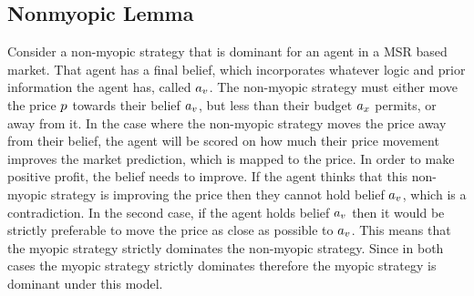 \subsection{Nonmyopic Lemma}
Consider a non-myopic strategy that is dominant for an agent in a MSR based market. That agent has a final belief, which incorporates whatever logic and prior information the agent has, called $a_v$. The non-myopic strategy must either move the price $p$ towards their belief $a_v$, but less than their budget $a_x$ permits, or away from it. In the case where the non-myopic strategy moves the price away from their belief, the agent will be scored on how much their price movement improves the market prediction, which is mapped to the price. In order to make positive profit, the belief needs to improve. If the agent thinks that this non-myopic strategy is improving the price then they cannot hold belief $a_v$, which is a contradiction. In the second case, if the agent holds belief $a_v$ then it would be strictly preferable to move the price as close as possible to $a_v$. This means that the myopic strategy strictly dominates the non-myopic strategy. Since in both cases the myopic strategy strictly dominates therefore the myopic strategy is dominant under this model.\\